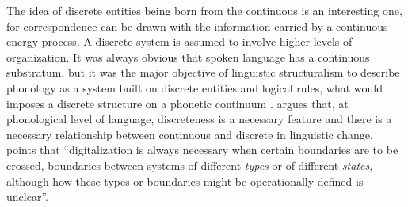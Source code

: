 The idea of discrete entities being born from the continuous is an interesting one,
for correspondence can be drawn with the information carried by a continuous energy process.
A discrete system is assumed to involve higher levels of organization.
It was always obvious that spoken language has a continuous substratum, but
it was the major objective of linguistic structuralism to describe phonology
as a system built on discrete entities and logical rules, what would imposes
a discrete structure on a phonetic continuum \citep{chomsky1957}. 
\cite{mandelbrot1954} argues that, at phonological level of language, discreteness is a necessary feature
and there is a necessary relationship between continuous and discrete in linguistic change.
\cite{wilden2001} points that ``digitalization is always necessary when certain boundaries are to be crossed,
boundaries between systems of different \textit{types} or of different \textit{states},
although how these types or boundaries might be operationally defined is unclear''. 



